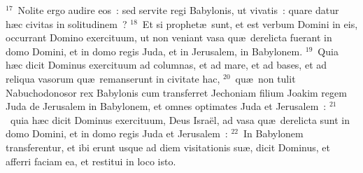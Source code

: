 ${}^{17}$~Nolite ergo audire eos~: sed servite regi Babylonis, ut vivatis~: quare datur h\ae c civitas in solitudinem~?
${}^{18}$~Et si prophet\ae\ sunt, et est verbum Domini in eis, occurrant Domino exercituum, ut non veniant vasa qu\ae\ derelicta fuerant in domo Domini, et in domo regis Juda, et in Jerusalem, in Babylonem.
${}^{19}$~Quia h\ae c dicit Dominus exercituum ad columnas, et ad mare, et ad bases, et ad reliqua vasorum qu\ae\ remanserunt in civitate hac,
${}^{20}$~qu\ae\ non tulit Nabuchodonosor rex Babylonis cum transferret Jechoniam filium Joakim regem Juda de Jerusalem in Babylonem, et omnes optimates Juda et Jerusalem~:
${}^{21}$~quia h\ae c dicit Dominus exercituum, Deus Isra\"el, ad vasa qu\ae\ derelicta sunt in domo Domini, et in domo regis Juda et Jerusalem~:
${}^{22}$~In Babylonem transferentur, et ibi erunt usque ad diem visitationis su\ae , dicit Dominus, et afferri faciam ea, et restitui in loco isto.

